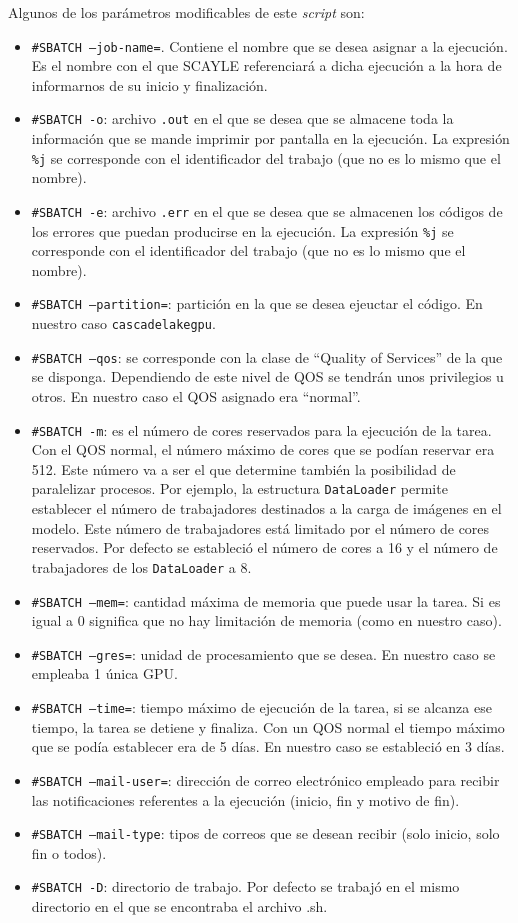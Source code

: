 Algunos de los parámetros modificables de este \textit{script} son:
\begin{itemize}
    \item \texttt{\#SBATCH --job-name=}. Contiene el nombre que se desea asignar a la ejecución. Es el nombre con el que SCAYLE referenciará a dicha ejecución a la hora de informarnos de su inicio y finalización.
    \item \texttt{\#SBATCH -o}: archivo \texttt{.out} en el que se desea que se almacene toda la información que se mande imprimir por pantalla en la ejecución. La expresión \texttt{\%j} se corresponde con el identificador del trabajo (que no es lo mismo que el nombre).
    \item \texttt{\#SBATCH -e}: archivo \texttt{.err} en el que se desea que se almacenen los códigos de los errores que puedan producirse en la ejecución. La expresión \texttt{\%j} se corresponde con el identificador del trabajo (que no es lo mismo que el nombre).
    \item \texttt{\#SBATCH --partition=}: partición en la que se desea ejeuctar el código. En nuestro caso \texttt{cascadelakegpu}.
    \item \texttt{\#SBATCH --qos}: se corresponde con la clase de ``Quality of Services'' de la que se disponga. Dependiendo de este nivel de QOS se tendrán unos privilegios u otros. En nuestro caso el QOS asignado era ``normal''.
    \item \texttt{\#SBATCH -m}: es el número de cores reservados para la ejecución de la tarea. Con el QOS normal, el número máximo de cores que se podían reservar era 512. Este número va a ser el que determine también la posibilidad de paralelizar procesos. Por ejemplo, la estructura \texttt{DataLoader} permite establecer el número de trabajadores destinados a la carga de imágenes en el modelo. Este número de trabajadores está limitado por el número de cores reservados. Por defecto se estableció el número de cores a 16 y el número de trabajadores de los \texttt{DataLoader} a 8.
    \item \texttt{\#SBATCH --mem=}: cantidad máxima de memoria que puede usar la tarea. Si es igual a 0 significa que no hay limitación de memoria (como en nuestro caso).
    \item \texttt{\#SBATCH --gres=}: unidad de procesamiento que se desea. En nuestro caso se empleaba 1 única GPU.
    \item \texttt{\#SBATCH --time=}: tiempo máximo de ejecución de la tarea, si se alcanza ese tiempo, la tarea se detiene y finaliza. Con un QOS normal el tiempo máximo que se podía establecer era de 5 días. En nuestro caso se estableció en 3 días.
    \item \texttt{\#SBATCH --mail-user=}: dirección de correo electrónico empleado para recibir las notificaciones referentes a la ejecución (inicio, fin y motivo de fin).
    \item \texttt{\#SBATCH --mail-type}: tipos de correos que se desean recibir (solo inicio, solo fin o todos).
    \item \texttt{\#SBATCH -D}: directorio de trabajo. Por defecto se trabajó en el mismo directorio en el que se encontraba el archivo .sh.
\end{itemize}


